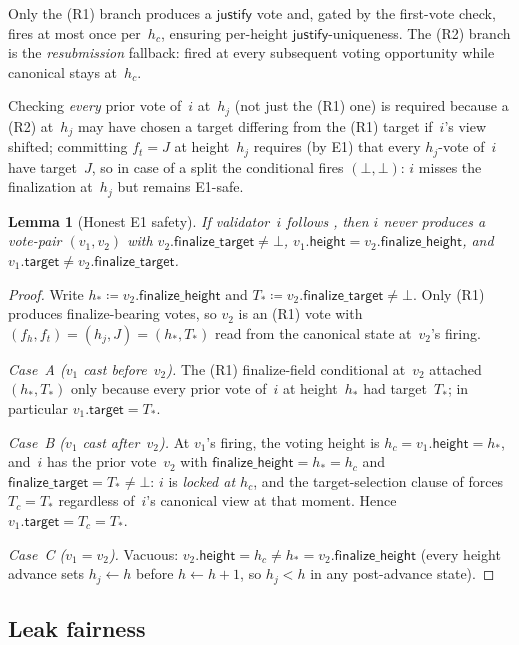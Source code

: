 \ifx\litemode\undefined\documentclass{article}\fi
\newcommand{\target}{\mathsf{target}}
\newcommand{\height}{\mathsf{height}}
\newcommand{\just}{\ensuremath{\mathsf{justify}}\xspace}
\newcommand{\finalizeHeight}{\mathsf{finalize\_height}}
\newcommand{\finalizeTarget}{\mathsf{finalize\_target}}
\theoremstyle{plain}
\newtheorem{lemma}{Lemma}
\theoremstyle{definition}
\theoremstyle{remark}
\begin{document}
Only the (R1) branch produces a \just vote and, gated by the first-vote check, fires at most once per~$h_c$, ensuring per-height \just-uniqueness.
The (R2) branch is the \emph{resubmission} fallback: fired at every subsequent voting opportunity while canonical stays at~$h_c$.

Checking \emph{every} prior vote of~$i$ at~$h_j$ (not just the (R1) one) is required because a (R2) at~$h_j$ may have chosen a target differing from the (R1) target if~$i$'s view shifted; committing $f_t = J$ at height~$h_j$ requires (by E1) that every $h_j$-vote of~$i$ have target~$J$, so in case of a split the conditional fires $(\bot, \bot)$: $i$ misses the finalization at~$h_j$ but remains E1-safe.

\begin{lemma}[Honest E1 safety]\label{lem:honest-e1-safety}
If validator~$i$ follows , then $i$ never produces a vote-pair $(v_1, v_2)$ with $v_2.\finalizeTarget \neq \bot$, $v_1.\height = v_2.\finalizeHeight$, and $v_1.\target \neq v_2.\finalizeTarget$.
\end{lemma}

\begin{proof}
Write $h_\ast \coloneqq v_2.\finalizeHeight$ and $T_\ast \coloneqq v_2.\finalizeTarget \neq \bot$.
Only (R1) produces finalize-bearing votes, so $v_2$ is an (R1) vote with $(f_h, f_t) = (h_j, J) = (h_\ast, T_\ast)$ read from the canonical state at~$v_2$'s firing.

\emph{Case~A ($v_1$ cast before~$v_2$).}
The (R1) finalize-field conditional at~$v_2$ attached $(h_\ast, T_\ast)$ only because every prior vote of~$i$ at height~$h_\ast$ had target~$T_\ast$; in particular $v_1.\target = T_\ast$.

\emph{Case~B ($v_1$ cast after~$v_2$).}
At $v_1$'s firing, the voting height is $h_c = v_1.\height = h_\ast$, and~$i$ has the prior vote~$v_2$ with $\finalizeHeight = h_\ast = h_c$ and $\finalizeTarget = T_\ast \neq \bot$: $i$ is \emph{locked at $h_c$}, and the target-selection clause of  forces $T_c = T_\ast$ regardless of~$i$'s canonical view at that moment.
Hence $v_1.\target = T_c = T_\ast$.

\emph{Case~C ($v_1 = v_2$).}
Vacuous: $v_2.\height = h_c \neq h_\ast = v_2.\finalizeHeight$ (every height advance sets $h_j \gets h$ before $h \gets h + 1$, so $h_j < h$ in any post-advance state).
\end{proof}

\subsection{Leak fairness}
\end{document}
